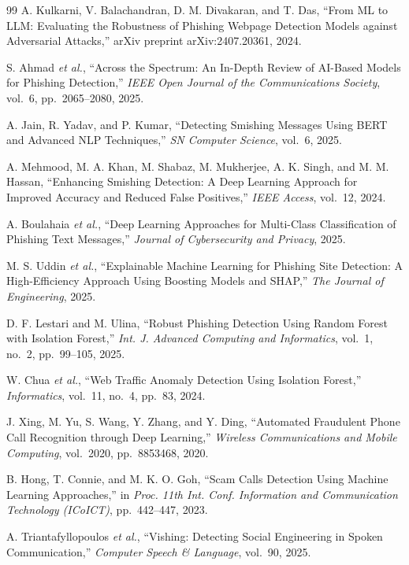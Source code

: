 \begin{thebibliography}{99}
A. Kulkarni, V. Balachandran, D. M. Divakaran, and T. Das, ``From {ML} to {LLM}: Evaluating the Robustness of Phishing Webpage Detection Models against Adversarial Attacks,'' arXiv preprint arXiv:2407.20361, 2024.

S. Ahmad \textit{et al.}, ``Across the Spectrum: An In-Depth Review of {AI}-Based Models for Phishing Detection,'' \textit{IEEE Open Journal of the Communications Society}, vol.~6, pp.~2065--2080, 2025.

A. Jain, R. Yadav, and P. Kumar, ``Detecting Smishing Messages Using {BERT} and Advanced {NLP} Techniques,'' \textit{SN Computer Science}, vol.~6, 2025.

A. Mehmood, M. A. Khan, M. Shabaz, M. Mukherjee, A. K. Singh, and M. M. Hassan, ``Enhancing Smishing Detection: A Deep Learning Approach for Improved Accuracy and Reduced False Positives,'' \textit{IEEE Access}, vol.~12, 2024.

A. Boulahaia \textit{et al.}, ``Deep Learning Approaches for Multi-Class Classification of Phishing Text Messages,'' \textit{Journal of Cybersecurity and Privacy}, 2025.

M. S. Uddin \textit{et al.}, ``Explainable Machine Learning for Phishing Site Detection: A High-Efficiency Approach Using Boosting Models and {SHAP},'' \textit{The Journal of Engineering}, 2025.

D. F. Lestari and M. Ulina, ``Robust Phishing Detection Using Random Forest with Isolation Forest,'' \textit{Int. J. Advanced Computing and Informatics}, vol.~1, no.~2, pp.~99--105, 2025.

W. Chua \textit{et al.}, ``Web Traffic Anomaly Detection Using Isolation Forest,'' \textit{Informatics}, vol.~11, no.~4, pp.~83, 2024.

J. Xing, M. Yu, S. Wang, Y. Zhang, and Y. Ding, ``Automated Fraudulent Phone Call Recognition through Deep Learning,'' \textit{Wireless Communications and Mobile Computing}, vol.~2020, pp.~8853468, 2020.

B. Hong, T. Connie, and M. K. O. Goh, ``Scam Calls Detection Using Machine Learning Approaches,'' in \textit{Proc. 11th Int. Conf. Information and Communication Technology (ICoICT)}, pp.~442--447, 2023.

A. Triantafyllopoulos \textit{et al.}, ``Vishing: Detecting Social Engineering in Spoken Communication,'' \textit{Computer Speech \& Language}, vol.~90, 2025.


\end{thebibliography}
